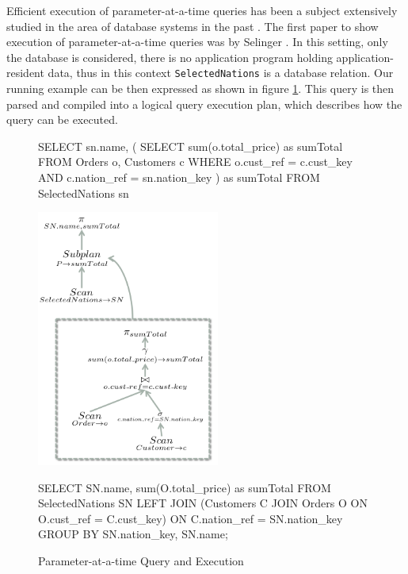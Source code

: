 Efficient execution of parameter-at-a-time queries has been a subject extensively studied in the area of database systems in the past  \cite{selinger:1979aa} \cite{dayal:1987aa} \cite{kim:1982aa} \cite{ganski:1987aa} \cite{seshadri:1996aa}. The first paper to show execution of parameter-at-a-time queries was by Selinger  \cite{selinger:1979aa}. In this setting, only the database is considered, there is no application program holding application-resident data, thus in this context \texttt{SelectedNations} is a database relation. Our running example can be then expressed as shown in figure \ref{fig:taat}. This query is then parsed and compiled into a logical query execution plan, which describes how the query can be executed. 

\begin{figure}[h]
\centering
\begin{minipage}{0.45\textwidth}
\centering
\begin{SQL}
SELECT sn.name, (
   SELECT sum(o.total_price) as sumTotal
    FROM Orders o, Customers c
    WHERE o.cust_ref = c.cust_key
    AND c.nation_ref = sn.nation_key
  ) as sumTotal
 FROM SelectedNations sn
\end{SQL}
\includegraphics[width=6cm]{images/TAATExecution}
\caption{Parameter-at-a-time Query and Execution}
\label{fig:taat}
\end{minipage} \hfill
\begin{minipage}{0.45\textwidth}
\centering
\begin{SQL}
SELECT SN.name, sum(O.total_price) as sumTotal
FROM SelectedNations SN
LEFT JOIN (Customers C
   JOIN Orders O 
   ON O.cust_ref = C.cust_key)
ON C.nation_ref = SN.nation_key
GROUP BY SN.nation_key, SN.name;
\end{SQL}

\end{minipage}
\end{figure}
